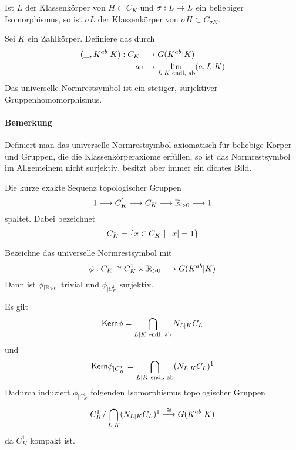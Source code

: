 \Bem{}
Ist $L$ der Klassenkörper von $H \subset C_K$ und $\sigma : L \overset{}{\rightarrow} L$ ein beliebiger Isomorphismus, so ist $\sigma L$ der Klassenkörper von $\sigma H \subset C_{\sigma K}$.

Sei $K$ ein Zahlkörper. Definiere das  durch
\begin{align*}
(\_, K^{ab} | K)  : C_K& \overset{}{\longrightarrow} G(K^{ab}|K) \\
a & \longmapsto  \lim\limits_{L|K \text{ endl, ab}}(a, L|K)
\end{align*}
Das universelle Normrestsymbol ist ein stetiger, surjektiver Gruppenhomomorphismus.
\paragraph{Bemerkung} Definiert man das universelle Normrestsymbol axiomatisch für beliebige Körper und Gruppen, die die Klassenkörperaxiome erfüllen, so ist das Normrestsymbol im Allgemeinem nicht surjektiv, besitzt aber immer ein dichtes Bild.

\Prop{}
Die kurze exakte Sequenz topologischer Gruppen
\[ 1 \overset{}{\longrightarrow} C_K^1 \overset{}{\longrightarrow} C_K \overset{}{\longrightarrow} \mathbb{R}_{> 0} \overset{}{\longrightarrow} 1 \]
spaltet. Dabei bezeichnet
\[ C_K^1 = \set{x \in C_K}{\bet{x} = 1} \]

\Lem{}
Bezeichne das universelle Normrestsymbol mit
\[ \phi : C_K \overset{}{\cong} C_K^1 \times \mathbb{R}_{>0} \overset{}{\longrightarrow} G(K^{ab}|K) \]
Dann ist $\phi_{|\mathbb{R}_{>0}}$ trivial und $\phi_{|C_K^1}$ surjektiv.

\Bem{}
Es gilt
\[ \textsf{Kern} \phi = \bigcap_{L|K \text{ endl, ab}}N_{L|K}C_L \]
und
\[ \textsf{Kern} \phi_{|C_K^1} = \bigcap_{L|K \text{ endl, ab}}(N_{L|K}C_L)^1 \]
Dadurch induziert $\phi_{|C_K^1}$ folgenden Isomorphismus topologischer Gruppen
\[ C_K^1/\bigcap_{L|K}(N_{L|K}C_L)^1 \overset{\overset{}{\cong}}{\longrightarrow} G(K^{ab}|K) \]
da $C_K^1$ kompakt ist.
